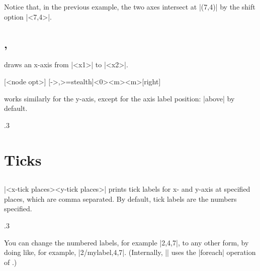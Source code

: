 Notice that, in the previous example, the two axes intersect at |(7,4)| by the shift option |<7,4>|.

\subsection{\protect\cmd{\tzaxisx}, \protect\cmd{\tzaxisy}}
\label{ssi:tzaxesx}

\icmd{\tzaxisx} draws an x-axis from |<x1>| to |<x2>|.

\begin{tzdef}{}
[<node opt>]
  [->,>=stealth]<0>{<m>}{<m>}{}[right]
\end{tzdef}

\icmd{\tzaxisy} works similarly for the y-axis, except for the axis label position: |above| by default.

\begin{tzcode}{.3}
\end{tzcode}


\section{Ticks}
\label{si:tikzs}

\subsection{\protect\cmd{\tzticks}}
\label{ssi:tzticks}

\icmd{\tzticks}|{<x-tick places>}{<y-tick places>}| prints tick labels for x- and y-axis at specified places, which are comma separated.
By default, tick labels are the numbers specified.

\begin{tzcode}{.3}
\end{tzcode}

You can change the numbered labels, for example |{2,4,7}|, to any other form, by doing like, for example, |{2/mylabel,4,7}|. (Internally, |\tzticks| uses the |foreach| operation of \Tikz.)

